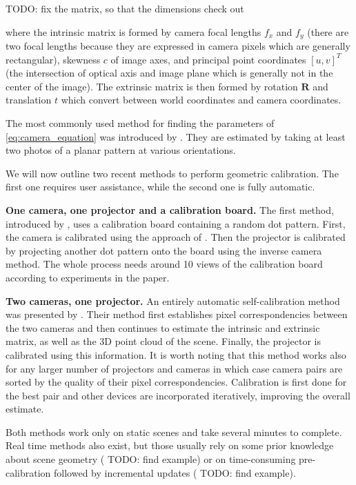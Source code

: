 {\color{red} TODO: fix the matrix, so that the dimensions check out}

where the intrinsic matrix is formed by camera focal lengths \(f_x\) and \(f_y\) (there are two focal lengths because they are expressed in camera pixels which are generally rectangular), skewness \(c\) of image axes, and principal point coordinates \([u, v]^T\) (the intersection of optical axis and image plane which is generally not in the center of the image). The extrinsic matrix is then formed by rotation \(\mathbf{R}\) and translation \(t\) which convert between world coordinates and camera coordinates.

The most commonly used method for finding the parameters of \ref{eq:camera_equation} was introduced by \citet{Zhang1999}. They are estimated by taking at least two photos of a planar pattern at various orientations.

We will now outline two recent methods to perform geometric calibration. The first one requires user assistance, while the second one is fully automatic.

\textbf{One camera, one projector and a calibration board.} The first method, introduced by \citet{Yang2016}, uses a calibration board containing a random dot pattern. First, the camera is calibrated using the approach of \citet{Zhang1999}. Then the projector is calibrated by projecting another dot pattern onto the board using the inverse camera method. The whole process needs around 10 views of the calibration board according to experiments in the paper.

\textbf{Two cameras, one projector.} An entirely automatic self-calibration method was presented by \citet{Willi2017}. Their method first establishes pixel correspondencies between the two cameras and then continues to estimate the intrinsic and extrinsic matrix, as well as the 3D point cloud of the scene. Finally, the projector is calibrated using this information. It is worth noting that this method works also for any larger number of projectors and cameras in which case camera pairs are sorted by the quality of their pixel correspondencies. Calibration is first done for the best pair and other devices are incorporated iteratively, improving the overall estimate.

Both methods work only on static scenes and take several minutes to complete. Real time methods also exist, but those usually rely on some prior knowledge about scene geometry ({\color{red} TODO: find example}) or on time-consuming pre-calibration followed by incremental updates ({\color{red} TODO: find example}).


